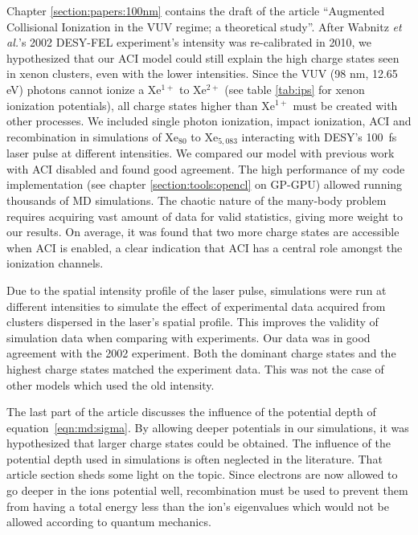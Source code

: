 Chapter \ref{section:papers:100nm} contains the draft of the article
``Augmented Collisional Ionization in the VUV regime; a theoretical study''.
After Wabnitz \textit{et al.}'s
2002 DESY-FEL experiment's intensity was re-calibrated in 2010, we hypothesized
that our ACI model could still explain the high charge states seen in xenon
clusters, even with the lower intensities.
Since the VUV (98 nm, 12.65 eV)
photons cannot ionize a Xe$^{1+}$ to Xe$^{2+}$ (see table \ref{tab:ips} for xenon
ionization potentials), all charge states higher than Xe$^{1+}$ must be created
with other processes.
We included single photon ionization,
impact ionization, ACI and recombination in simulations of Xe$_{80}$ to Xe$_{5,083}$
interacting with DESY's 100~fs laser pulse at different intensities.
We compared our model
with previous work with ACI disabled and found good agreement.
The high performance of my
code implementation (see chapter \ref{section:tools:opencl} on GP-GPU) allowed
running thousands of MD simulations. The chaotic nature of the many-body
problem requires acquiring vast amount of data for valid statistics, giving more
weight to our results. On average, it was found that two more charge states are
accessible when ACI is enabled, a clear indication that ACI has a central role
amongst the ionization channels.

Due to the spatial intensity profile of the laser pulse, simulations were run
at different intensities to simulate the effect of experimental data acquired
from clusters dispersed in the laser's spatial profile. This improves the validity of
simulation data when comparing with experiments.
Our data was in good agreement with the 2002 experiment. Both the dominant
charge states and the highest charge states matched the experiment data. This
was not the case of other models which used the old intensity.

The last part of the article discusses the influence of the potential depth
of equation~\eqref{eqn:md:sigma}.
By allowing deeper potentials in our
simulations, it was hypothesized that larger charge states could be obtained.
The influence of the potential depth used in simulations is often neglected in
the literature. That article section sheds some light on the topic.
Since electrons are now allowed to go deeper in the ions potential well,
recombination must be used to prevent them from having a total energy less than
the ion's eigenvalues which would not be allowed according to quantum mechanics.



